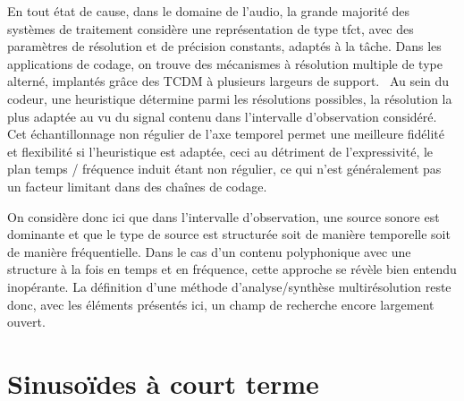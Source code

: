 


En tout état de cause, dans le domaine de l'audio, la grande majorité des systèmes de traitement considère une représentation de type tfct, avec des paramètres de résolution et de précision constants, adaptés à la tâche. Dans les applications de codage, on trouve des mécanismes à résolution multiple de type alterné, implantés grâce des TCDM à plusieurs largeurs de support.~\cite{brandenburg1999mp3} Au sein du codeur, une heuristique détermine parmi les résolutions possibles, la résolution la plus adaptée au vu du signal contenu dans l'intervalle d'observation considéré. Cet échantillonnage non régulier de l'axe temporel permet une meilleure fidélité et flexibilité si l'heuristique est adaptée, ceci au détriment de l'expressivité, le plan temps / fréquence induit étant non régulier, ce qui n'est généralement pas un facteur limitant dans des chaînes de codage.

On considère donc ici que dans l'intervalle d'observation, une source sonore est dominante et que le type de source est structurée soit de manière temporelle soit de manière fréquentielle. Dans le cas d'un contenu polyphonique avec une structure à la fois en temps et en fréquence, cette approche se révèle bien entendu inopérante. La définition d'une méthode d'analyse/synthèse multirésolution reste donc, avec les éléments présentés ici, un champ de recherche encore largement ouvert.

\section{ \nmu Sinusoïdes à court terme}  \label{sec:sct}

